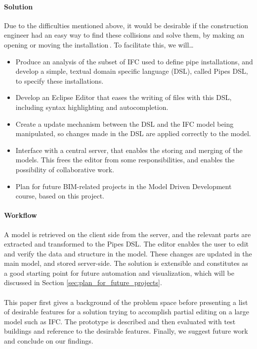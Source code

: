 \paragraph{Solution}
Due to the difficulties mentioned above, it would be desirable if the construction engineer had an easy way to find these collisions and solve them, by making an opening or moving the installation\,\cite{jorgensen12}. To facilitate this, we will…
\begin{itemize}
\item Produce an analysis of the subset of IFC used to define pipe installations, and develop a simple, textual domain specific language (DSL), called Pipes DSL, to specify these installations.
\item Develop an Eclipse Editor that eases the writing of files with this DSL, including syntax highlighting and autocompletion.
\item Create a update mechanism between the DSL and the IFC model being manipulated, so changes made in the DSL are applied correctly to the model.
\item Interface with a central server, that enables the storing and merging of the models. This frees the editor from some responsibilities, and enables the possibility of collaborative work.
\item Plan for future BIM-related projects in the Model Driven Development course, based on this project.
\end{itemize}

\paragraph{Workflow}
\label{sec:workflow}
A model is retrieved on the client side from the server, and the relevant parts are extracted and transformed to the Pipes DSL. The editor enables the user to edit and verify the data and structure in the model. These changes are updated in the main model, and stored server-side. The solution is extensible and constitutes as a good starting point for future automation and visualization, which will be discussed in Section \ref{sec:plan_for_future_projects}.

\paragraph{} 
This paper first gives a background of the problem space before presenting a list of desirable features for a solution trying to accomplish partial editing on a large model such as IFC. The prototype is described and then evaluated with test buildings and reference to the desirable features. Finally, we suggest future work and conclude on our findings.
